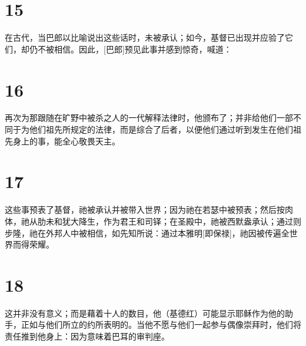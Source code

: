 
\section{15}

在古代，当巴郎以比喻说出这些话时，未被承认；如今，基督已出现并应验了它们，却仍不被相信。因此，[巴郎]预见此事并感到惊奇，喊道：\par


\section{16}

再次为那跟随在旷野中被杀之人的一代解释法律时，他颁布了；并非给他们一部不同于为他们祖先所规定的法律，而是综合了后者，以便他们通过听到发生在他们祖先身上的事，能全心敬畏天主。\par


\section{17}

这些事预表了基督，祂被承认并被带入世界；因为祂在若瑟中被预表；然后按肉体，祂从肋未和犹大降生，作为君王和司铎；在圣殿中，祂被西默盎承认；通过则步隆，祂在外邦人中被相信，如先知所说：通过本雅明[即保禄]，祂因被传遍全世界而得荣耀。\par


\section{18}

这并非没有意义；而是藉着十人的数目，他（基德红）可能显示耶稣作为他的助手，正如与他们所立的约所表明的。当他不愿与他们一起参与偶像崇拜时，他们将责任推到他身上：因为意味着巴耳的审判座。\par


